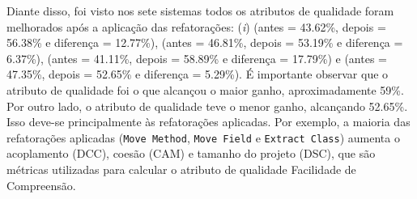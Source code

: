 Diante disso, foi visto nos sete sistemas todos os atributos de qualidade foram melhorados após a aplicação das refatorações: (\textit{i})  (antes = 43.62\%, depois = 56.38\% e diferença = 12.77\%),  (antes = 46.81\%, depois = 53.19\% e diferença = 6.37\%),  (antes = 41.11\%, depois = 58.89\% e diferença = 17.79\%) e  (antes = 47.35\%, depois = 52.65\% e diferença = 5.29\%).
É importante observar que o atributo de qualidade  foi o que alcançou o maior ganho, aproximadamente 59\%. Por outro lado, o atributo de qualidade  teve o menor ganho, alcançando  52.65\%. Isso deve-se principalmente às refatorações aplicadas. Por exemplo, a maioria das refatorações aplicadas (\texttt{Move Method}, \texttt{Move Field} e \texttt{Extract Class}) aumenta o acoplamento (DCC), coesão (CAM) e tamanho do projeto (DSC), que são métricas utilizadas para calcular o atributo de qualidade Facilidade de Compreensão.